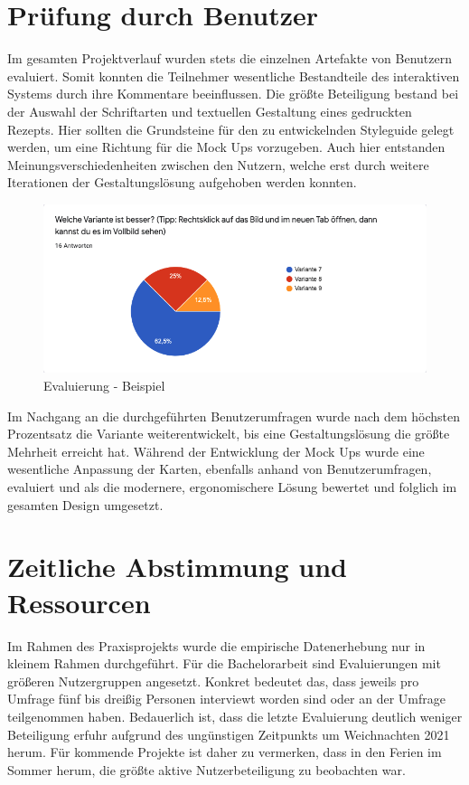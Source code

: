 \section{Prüfung durch Benutzer}
Im gesamten Projektverlauf wurden stets die einzelnen Artefakte von Benutzern evaluiert. Somit konnten die Teilnehmer wesentliche Bestandteile des interaktiven Systems durch ihre Kommentare beeinflussen. Die größte Beteiligung bestand bei der Auswahl der Schriftarten und textuellen Gestaltung eines gedruckten Rezepts. Hier sollten die Grundsteine für den zu entwickelnden Styleguide gelegt werden, um eine Richtung für die Mock Ups vorzugeben. Auch hier entstanden Meinungsverschiedenheiten zwischen den Nutzern, welche erst durch weitere Iterationen der Gestaltungslösung aufgehoben werden konnten. \\

\begin{figure}[h] %
    \includegraphics[width=1\textwidth]{images/EvaluierungBeispiel.png}
    \caption[Evaluierung - Beispiel]{Evaluierung - Beispiel}
    \label{fig:EvaluierungBeispiel}
\end{figure}

Im Nachgang an die durchgeführten Benutzerumfragen wurde nach dem höchsten Prozentsatz die Variante weiterentwickelt, bis eine Gestaltungslösung die größte Mehrheit erreicht hat. Während der Entwicklung der Mock Ups wurde eine wesentliche Anpassung der Karten, ebenfalls anhand von Benutzerumfragen, evaluiert und als die modernere, ergonomischere Lösung bewertet und folglich im gesamten Design umgesetzt. 

\section{Zeitliche Abstimmung und Ressourcen}
Im Rahmen des Praxisprojekts wurde die empirische Datenerhebung nur in kleinem Rahmen durchgeführt. Für die Bachelorarbeit sind Evaluierungen mit größeren Nutzergruppen angesetzt. Konkret bedeutet das, dass jeweils pro Umfrage fünf bis dreißig Personen interviewt worden sind oder an der Umfrage teilgenommen haben. Bedauerlich ist, dass die letzte Evaluierung deutlich weniger Beteiligung erfuhr aufgrund des ungünstigen Zeitpunkts um Weichnachten 2021 herum. Für kommende Projekte ist daher zu vermerken, dass in den Ferien im Sommer herum, die größte aktive Nutzerbeteiligung zu beobachten war.\\ 

